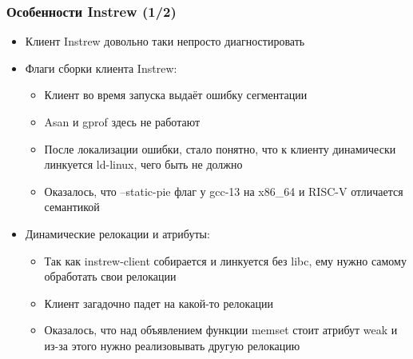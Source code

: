 \documentclass{beamer}
\begin{document}
\begin{frame}[fragile]
  \frametitle{Особенности Instrew (1/2)}
  \begin{itemize}
    \item Клиент Instrew довольно таки непросто диагностировать
    \item Флаги сборки клиента Instrew:
          \begin{itemize}
            \item Клиент во время запуска выдаёт ошибку сегментации
            \item Asan и gprof здесь не работают
	    \item После локализации ошибки, стало понятно, что к клиенту динамически линкуется ld-linux, чего быть не должно
            \item Оказалось, что --static-pie флаг у gcc-13 на x86\_64 и RISC-V отличается семантикой
          \end{itemize}
    \item Динамические релокации и атрибуты:
          \begin{itemize}
            \item Так как instrew-client собирается и линкуется без libc, ему нужно самому обработать свои релокации
            \item Клиент загадочно падет на какой-то релокации
            \item Оказалось, что над объявлением функции memset стоит атрибут weak и из-за этого нужно реализовывать другую релокацию
          \end{itemize}
  \end{itemize}
\end{frame}
\end{document}
